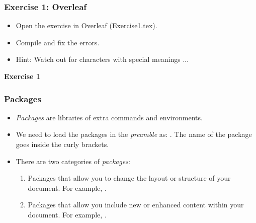 
\begin{frame}
\frametitle{Exercise 1: Overleaf}
\begin{itemize}
\item Open the exercise in Overleaf (Exercise1.tex).
\item Compile and fix the errors.
\item  Hint: Watch out for characters with special meanings ...
\end{itemize}

\textbf{Exercise 1}
\noindent{}
\end{frame}


\begin{frame}[fragile] %
\frametitle{Packages}
\begin{itemize}
\item \textit{Packages} are libraries of extra commands and environments. \\
\item We need to load the packages in the \textit{preamble} as: \color{blue}{\verb|\usepackage{}|} \color{black}{}. The name of the package goes inside the curly brackets. \\
\item There are two categories of \textit{packages}: 
\begin{enumerate}
\item Packages that allow you to change the layout or structure of your document. For example, \color{red}{multicol} \color{black}{}. \\
\item Packages that allow you include new or enhanced content within your document. For example, \color{red}{amsmath} \color{black}{}.  \\
\end{enumerate}
\color{black}
\end{itemize}
\end{frame}

